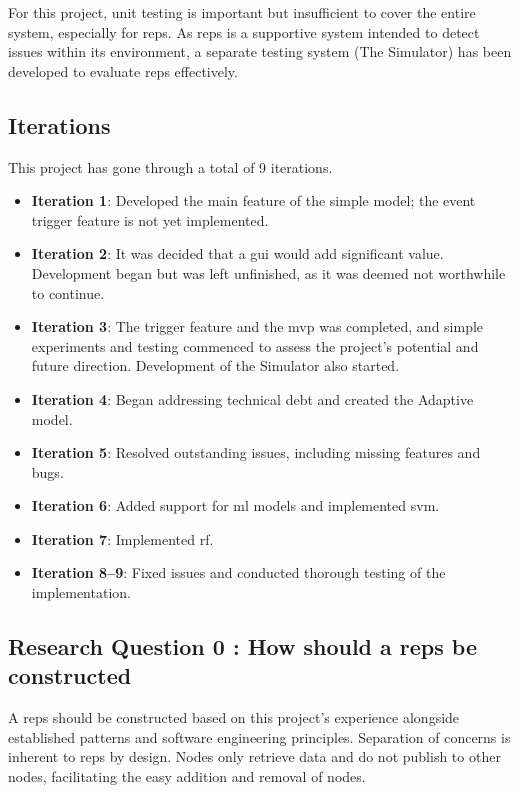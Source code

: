 		For this project, unit testing is important but insufficient to cover the entire system, especially for \gls{reps}. As \gls{reps} is a supportive system intended to detect issues within its environment, a separate testing system (The Simulator) has been developed to evaluate \gls{reps} effectively.
		
		\subsection{Iterations}
			This project has gone through a total of 9 iterations.
			\begin{itemize}
				\item \textbf{Iteration 1}: Developed the main feature of the simple model; the event trigger feature is not yet implemented.
				\item \textbf{Iteration 2}: It was decided that a \gls{gui} would add significant value. Development began but was left unfinished, as it was deemed not worthwhile to continue.
				\item \textbf{Iteration 3}: The trigger feature and the \gls{mvp} was completed, and simple experiments and testing commenced to assess the project’s potential and future direction. Development of the Simulator also started.
				\item \textbf{Iteration 4}: Began addressing technical debt and created the Adaptive model.
				\item \textbf{Iteration 5}: Resolved outstanding issues, including missing features and bugs.
				\item \textbf{Iteration 6}: Added support for \gls{ml} models and implemented \gls{svm}.
				\item \textbf{Iteration 7}: Implemented \gls{rf}.
				\item \textbf{Iteration 8--9}: Fixed issues and conducted thorough testing of the implementation.
			\end{itemize}
	\newpage
	\subsection{Research Question 0 : How should a \gls{reps} be constructed}
		A \gls{reps} should be constructed based on this project's experience alongside established patterns and software engineering principles. Separation of concerns is inherent to \gls{reps} by design. Nodes only retrieve data and do not publish to other nodes, facilitating the easy addition and removal of nodes.
		
